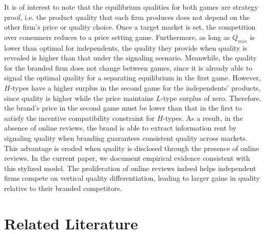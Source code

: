 \documentclass[mksc,blindrev]{informs3} %
\begin{document}
It is of interest to note that the equilibrium qualities for both games are strategy proof, i.e. the product quality that each firm produces does not depend on the other firm's price or quality choice. Once a target market is set, the competition over consumers reduces to a price setting game. Furthermore, as long as $Q_{min}$ is lower than optimal for independents, the quality they provide when quality is revealed is higher than that under the signaling scenario. Meanwhile, the quality for the branded firm does not change between games, since it is already able to signal the optimal quality for a separating equilibrium in the first game. However, $H$-types have a higher surplus in the second game for the independents' products, since quality is higher while the price maintains $L$-type surplus of zero. Therefore, the brand's price in the second game must be lower than that in the first to satisfy the incentive compatibility constraint for $H$-types. As a result, in the absence of online reviews, the brand is able to extract information rent by signaling quality when branding guarantees consistent quality across markets. This advantage is eroded when quality is disclosed through the presence of online reviews. In the current paper, we document empirical evidence consistent with this stylized model. The proliferation of online reviews indeed helps independent firms compete on vertical quality differentiation, leading to larger gains in quality relative to their branded competitors.

\section{Related Literature} \label{sec:litreview}

 
\end{document}
